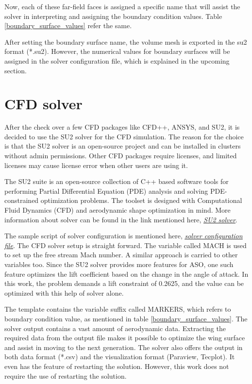 Now, each of these far-field faces is assigned a specific name that will assist the solver in interpreting and assigning the boundary condition values. Table \ref{boundary_surface_values} refer the same.



After setting the boundary surface name, the volume mesh is exported in the su2 format (*.su2). However, the numerical values for boundary surfaces will be assigned in the solver configuration file, which is explained in the upcoming section. 

\section{CFD solver}
After the check over a few CFD packages like CFD++, ANSYS, and SU2, it is decided to use the SU2 solver for the CFD simulation. The reason for the choice is that the SU2 solver is an open-source project and can be installed in clusters without admin permissions. Other CFD packages require licenses, and limited licenses may cause license error when other users are using it.

The SU2 suite is an open-source collection of C++ based software tools for performing Partial Differential Equation (PDE) analysis and solving PDE-constrained optimization problems. The toolset is designed with Computational Fluid Dynamics (CFD) and aerodynamic shape optimization in mind. More information about solver can be found in the link mentioned here, \href{https://su2code.github.io/docs_v7/home/}{\underline{\textit{SU2 solver}}}.

The sample script of solver configuration is mentioned here,
\href{https://github.com/neelu065/M-Tech_project_code/blob/master/Project_code_fNRAND1/optimizer_input/template.cfg}{\underline{\textit{solver configuration file}}}. The CFD solver setup is straight forward. The variable called MACH is used to set up the free stream Mach number. A similar approach is carried to other variables too. Since the SU2 solver provides more features for ASO, one such feature optimizes the lift coefficient based on the change in the angle of attack. In this work, the problem demands a lift constraint of 0.2625, and the value can be optimized with this help of solver alone. 

The template contains the variable suffix called MARKERS, which refers to boundary condition value, as mentioned in table \ref{boundary_surface_values}. The solver output contains a vast amount of aerodynamic data. Extracting the required data from the output file makes it possible to optimize the wing surface and assist in moving to the next generation. The solver also offers the output in both data format (*.csv) and the visualization format (Paraview, Tecplot). It even has the feature of restarting the solution. However, this work does not require the use of restarting the solution.

